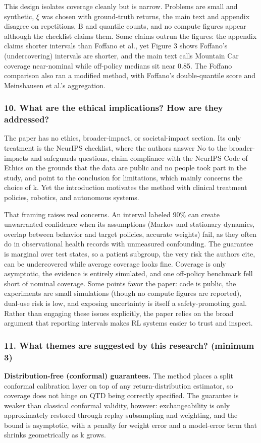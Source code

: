 \documentclass[11pt]{article}
\newcommand{\question}[1]{\subsubsection*{#1}}
\begin{document}
This design isolates coverage cleanly but is narrow. Problems are small and synthetic, \ensuremath{\xi} was chosen with ground-truth returns, the main text and appendix disagree on repetitions, B and quantile counts, and no compute figures appear although the checklist claims them. Some claims outrun the figures: the appendix claims shorter intervals than Foffano et al., yet Figure 3 shows Foffano's (undercovering) intervals are shorter, and the main text calls Mountain Car coverage near-nominal while off-policy medians sit near 0.85. The Foffano comparison also ran a modified method, with Foffano's double-quantile score and Meinshausen et al.'s aggregation.

\question{10. What are the ethical implications? How are they addressed?}

The paper has no ethics, broader-impact, or societal-impact section. Its only treatment is the NeurIPS checklist, where the authors answer No to the broader-impacts and safeguards questions, claim compliance with the NeurIPS Code of Ethics on the grounds that the data are public and no people took part in the study, and point to the conclusion for limitations, which mainly concerns the choice of k. Yet the introduction motivates the method with clinical treatment policies, robotics, and autonomous systems.

That framing raises real concerns. An interval labeled 90\% can create unwarranted confidence when its assumptions (Markov and stationary dynamics, overlap between behavior and target policies, accurate weights) fail, as they often do in observational health records with unmeasured confounding. The guarantee is marginal over test states, so a patient subgroup, the very risk the authors cite, can be undercovered while average coverage looks fine. Coverage is only asymptotic, the evidence is entirely simulated, and one off-policy benchmark fell short of nominal coverage. Some points favor the paper: code is public, the experiments are small simulations (though no compute figures are reported), dual-use risk is low, and exposing uncertainty is itself a safety-promoting goal. Rather than engaging these issues explicitly, the paper relies on the broad argument that reporting intervals makes RL systems easier to trust and inspect.

\question{11. What themes are suggested by this research? (minimum 3)}

\textbf{Distribution-free (conformal) guarantees.} The method places a split conformal calibration layer on top of any return-distribution estimator, so coverage does not hinge on QTD being correctly specified. The guarantee is weaker than classical conformal validity, however: exchangeability is only approximately restored through replay subsampling and weighting, and the bound is asymptotic, with a penalty for weight error and a model-error term that shrinks geometrically as k grows.
\end{document}
